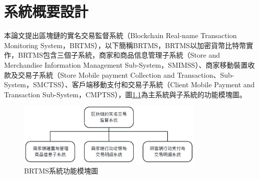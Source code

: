 \chapter{系統概要設計} 


	本論文提出區塊鏈的實名交易監督系統（Blockchain Real-name Transaction Monitoring System，BRTMS），以下簡稱BRTMS，BRTMS以加密貨幣比特幣實作，BRTMS包含三個子系統，商家和商品信息管理子系統（Store and Merchandise Information Management Sub-System，SMIMSS）、商家移動裝置收款及交易子系統（Store Mobile payment Collection and Transaction、Sub-System，SMCTSS）、客戶端移動支付和交易子系統（Client Mobile Payment and Transaction Sub-System，CMPTSS），圖\ref{model0}為主系統與子系統的功能模塊圖。

	\begin{figure}[htbp]
		\centering
		\includegraphics[width = 0.8\textwidth]{model0.jpg}
		\caption{BRTMS系統功能模塊圖}\label{model0}
	\end{figure}

